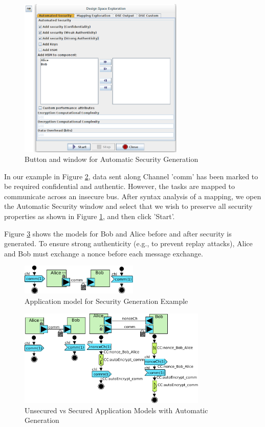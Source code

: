 \documentclass{llncs}
\begin{document}
\begin{figure}[htbp]
	\centering
 	\includegraphics[width=0.7\textwidth]{figures/securityStuff/autoSec.png}
	\caption{Button and window for Automatic Security Generation}
	\label{fig:autosec}
\end{figure}

In our example in Figure \ref{fig:autogenexample}, data sent along Channel 'comm' has been marked to be required confidential and authentic. However, the tasks are mapped to communicate across an insecure bus. After syntax analysis of a mapping, we open the Automatic Security window and select that we wish to preserve all security properties as shown in Figure \ref{fig:autosec}, and  then click 'Start'.

Figure \ref{fig:autogenres} shows the models for Bob and Alice before and after security is generated. To ensure strong authenticity (e.g., to prevent replay attacks), Alice and Bob must exchange a nonce before each message exchange.


\begin{figure}[htbp]
	\centering
 	\includegraphics[width=0.5\textwidth]{figures/securityStuff/secComp.pdf}
	\caption{Application model for Security Generation Example}
	\label{fig:autogenexample}
\end{figure}


\begin{figure}[htbp]
	\centering
 	\includegraphics[width=0.8\textwidth]{figures/securityStuff/secCompRes.pdf}
	\caption{Unsecured vs Secured Application Models with Automatic Generation}
	\label{fig:autogenres}
\end{figure}
%
%
%
\newpage
\end{document}
